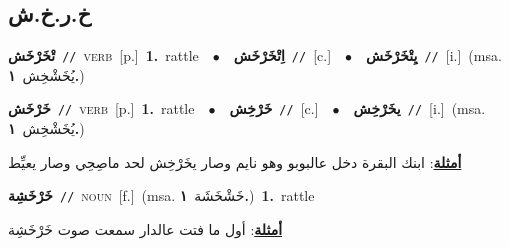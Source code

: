 \documentclass[10pt,a4paper,twoside]{article} %
\begin{document}
\begin{multicols}{2}
\vspace{-3mm}
\subsection*{\color{blue}\foreignlanguage{arabic}{خ.ر.خ.ش}\color{blue}{}} 

{\setlength\topsep{0pt}\textbf{\foreignlanguage{arabic}{تْخَرْخَش}}\ {\color{gray}\texttt{//}\color{black}}\ \textsc{verb}\ [p.]\ \textbf{1.}~rattle\ \ $\bullet$\ \ \setlength\topsep{0pt}\textbf{\foreignlanguage{arabic}{اِتْخَرْخَش}}\ {\color{gray}\texttt{//}\color{black}}\ [c.]\ \ $\bullet$\ \ \setlength\topsep{0pt}\textbf{\foreignlanguage{arabic}{يِتْخَرْخَش}}\ {\color{gray}\texttt{//}\color{black}}\ [i.]\ \color{gray}(msa. \foreignlanguage{arabic}{يُخَشْخِش}~\foreignlanguage{arabic}{\textbf{١.}})\color{black}\ } \vspace{2mm}

{\setlength\topsep{0pt}\textbf{\foreignlanguage{arabic}{خَرْخَش}}\ {\color{gray}\texttt{//}\color{black}}\ \textsc{verb}\ [p.]\ \textbf{1.}~rattle\ \ $\bullet$\ \ \setlength\topsep{0pt}\textbf{\foreignlanguage{arabic}{خَرْخِش}}\ {\color{gray}\texttt{//}\color{black}}\ [c.]\ \ $\bullet$\ \ \setlength\topsep{0pt}\textbf{\foreignlanguage{arabic}{يخَرْخِش}}\ {\color{gray}\texttt{//}\color{black}}\ [i.]\ \color{gray}(msa. \foreignlanguage{arabic}{يُخَشْخِش}~\foreignlanguage{arabic}{\textbf{١.}})\color{black}\  \begin{flushright}\color{gray}\foreignlanguage{arabic}{\textbf{\underline{\foreignlanguage{arabic}{أمثلة}}}: ابنك البقرة دخل عالبوبو وهو نايم وصار يخَرْخِش لحد ماصِحِي وصار يعيِّط}\end{flushright}\color{black}} \vspace{2mm}

{\setlength\topsep{0pt}\textbf{\foreignlanguage{arabic}{خَرْخَشِة}}\ {\color{gray}\texttt{//}\color{black}}\ \textsc{noun}\ [f.]\ \color{gray}(msa. \foreignlanguage{arabic}{خَشْخَشَة}~\foreignlanguage{arabic}{\textbf{١.}})\color{black}\ \textbf{1.}~rattle\  \begin{flushright}\color{gray}\foreignlanguage{arabic}{\textbf{\underline{\foreignlanguage{arabic}{أمثلة}}}: أول ما فتت عالدار سمعت صوت خَرْخَشِة}\end{flushright}\color{black}} \vspace{2mm}


\end{multicols}
\end{document}
